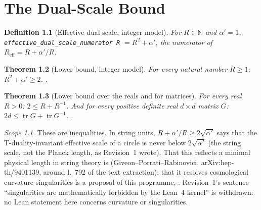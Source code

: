 \documentclass[11pt,a4paper]{report}
\newtheorem{theorem}{Theorem}[chapter]
\newtheorem{definition}[theorem]{Definition}
\theoremstyle{remark}
\newtheorem*{scope}{Scope}
\begin{document}
\chapter{The Dual-Scale Bound}

\begin{definition}[Effective dual scale, integer model]\label{def:effective_metric}
For $R\in\mathbb{N}$ and $\alpha'=1$, \texttt{effective\_dual\_scale\_numerator R} $=R^2+\alpha'$, the
numerator of $R_{\mathrm{eff}}=R+\alpha'/R$.
\end{definition}

\begin{theorem}[Lower bound, integer model]\label{thm:no_singularity}
\leanok
{}
For every natural number $R\ge1$: $R^2+\alpha'\ge 2$. \TA{}.
\end{theorem}

\begin{theorem}[Lower bound over the reals and for matrices]\label{thm:s2_dualscale}
\leanok
For every real $R>0$: $2\le R+R^{-1}$. And
\leanok
for every positive definite real $d\times d$ matrix $G$: $2d\le\operatorname{tr}G+\operatorname{tr}G^{-1}$.
\TA{}.
\end{theorem}
\begin{scope}
These are inequalities. In string units, $R+\alpha'/R\ge2\sqrt{\alpha'}$ says that the
T-duality-invariant effective scale of a circle is never below $2\sqrt{\alpha'}$ (the string scale, not the
Planck length, as Revision~1 wrote). That this reflects a minimal physical length in string theory is \TL{}
(Giveon--Porrati--Rabinovici, arXiv:hep-th/9401139, around l.~792 of the text extraction); that it resolves cosmological curvature singularities
is a proposal of this programme, \TC{}. Revision~1's sentence ``singularities are mathematically forbidden
by the Lean~4 kernel'' is withdrawn: no Lean statement here concerns curvature or singularities.
\end{scope}
\end{document}
